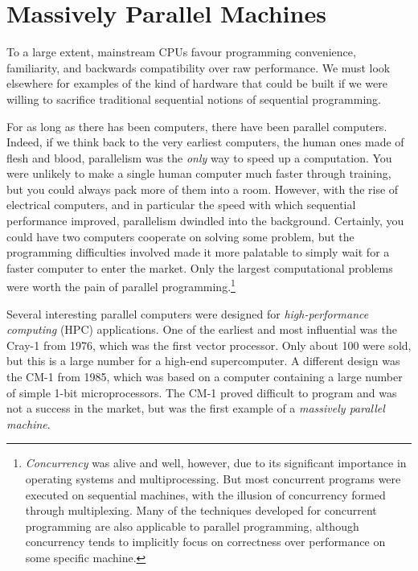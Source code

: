 \section{Massively Parallel Machines}
\label{sec:massively-parallel-machines}

To a large extent, mainstream CPUs favour programming convenience,
familiarity, and backwards compatibility over raw performance.  We
must look elsewhere for examples of the kind of hardware that could be
built if we were willing to sacrifice traditional sequential notions
of sequential programming.

For as long as there has been computers, there have been parallel
computers.  Indeed, if we think back to the very earliest computers,
the human ones made of flesh and blood, parallelism was the
\textit{only} way to speed up a computation.  You were unlikely to
make a single human computer much faster through training, but you
could always pack more of them into a room.  However, with the rise of
electrical computers, and in particular the speed with which
sequential performance improved, parallelism dwindled into the
background.  Certainly, you could have two computers cooperate on
solving some problem, but the programming difficulties involved made
it more palatable to simply wait for a faster computer to enter the
market.  Only the largest computational problems were worth the pain
of parallel programming.\footnote{\textit{Concurrency} was alive and
  well, however, due to its significant importance in operating
  systems and multiprocessing.  But most concurrent programs were
  executed on sequential machines, with the illusion of concurrency
  formed through multiplexing.  Many of the techniques developed for
  concurrent programming are also applicable to parallel programming,
  although concurrency tends to implicitly focus on correctness over
  performance on some specific machine.}

Several interesting parallel computers were designed for
\textit{high-performance computing} (HPC) applications.  One of the
earliest and most influential was the Cray-1 from 1976, which was the
first vector processor.  Only about 100 were sold, but this is a large
number for a high-end supercomputer.  A different design was the CM-1
from 1985, which was based on a computer containing a large number of
simple 1-bit microprocessors.  The CM-1 proved difficult to program
and was not a success in the market, but was the first example of a
\textit{massively parallel machine}.

